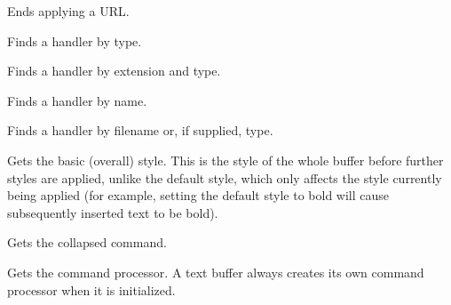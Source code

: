 \label{wxrichtextbufferendurl}


Ends applying a URL.

\label{wxrichtextbufferfindhandler}


Finds a handler by type.


Finds a handler by extension and type.


Finds a handler by name.

\label{wxrichtextbufferfindhandlerfilenameortype}


Finds a handler by filename or, if supplied, type.

\label{wxrichtextbuffergetbasicstyle}


Gets the basic (overall) style. This is the style of the whole
buffer before further styles are applied, unlike the default style, which
only affects the style currently being applied (for example, setting the default
style to bold will cause subsequently inserted text to be bold).

\label{wxrichtextbuffergetbatchedcommand}


Gets the collapsed command.

\label{wxrichtextbuffergetcommandprocessor}


Gets the command processor. A text buffer always creates its own command processor when it is
initialized.

\label{wxrichtextbuffergetdefaultstyle}

